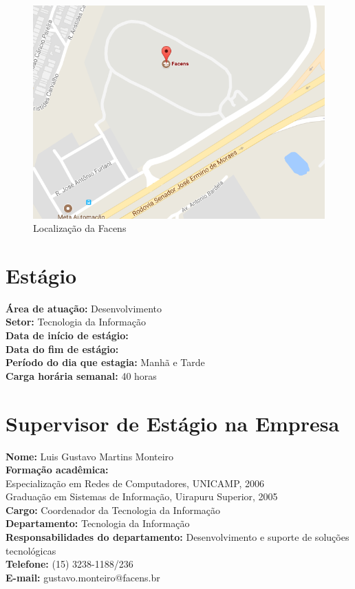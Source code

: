 \documentclass[
	12pt,				%
	oneside,			%
	a4paper,			%
	chapter=TITLE,		%
	section=TITLE,		%
	sumario=tradicional %
	english,			%
	french,				%
	spanish,			%
	brazil				%
	]{abntex2}
\begin{document}
\begin{figure}[htb]
\caption{\label{fig:mapsfacens} Localização da Facens}
\begin{center}
\includegraphics[scale=0.65]{MapsFacens}
\end{center}
\end{figure}

\section{Estágio}
\label{sec:estagio}
\textbf{Área de atuação:} Desenvolvimento \\
\indent \textbf{Setor:} Tecnologia da Informação \\
\indent \textbf{Data de início de estágio:} \\
\indent \textbf{Data do fim de estágio:} \\
\indent \textbf{Período do dia que estagia:} Manhã e Tarde \\
\indent \textbf{Carga horária semanal:} 40 horas \\

\section{Supervisor de Estágio na Empresa}
\label{sec:supestagioempre}
\textbf{Nome:} Luis Gustavo Martins Monteiro \\
\indent \textbf{Formação acadêmica:} \\
\indent \indent Especialização em Redes de Computadores, UNICAMP, 2006 \\
\indent \indent Graduação em Sistemas de Informação, Uirapuru Superior, 2005 \\
\indent \textbf{Cargo:} Coordenador da Tecnologia da Informação \\
\indent \textbf{Departamento:} Tecnologia da Informação \\
\indent \textbf{Responsabilidades do departamento:} Desenvolvimento e suporte de soluções tecnológicas \\
\indent \textbf{Telefone:} (15) 3238-1188/236 \\
\indent \textbf{E-mail:} gustavo.monteiro@facens.br \\
\end{document}
